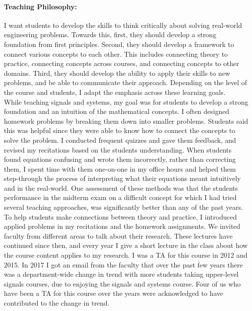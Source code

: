 \documentclass[10pt]{article}
\begin{document}
\paragraph{Teaching Philosophy: }
I want students to develop the skills to think critically about solving real-world engineering problems. 
Towards this, first, they should develop a strong foundation from first principles. Second, they should develop a framework to connect various concepts to each other. This includes connecting theory to practice, connecting concepts across courses, and connecting concepts to other domains. Third, they should develop the ability to apply their skills to new problems, and be able to communicate their approach. Depending on the level of the course and students, I adapt the emphasis across these learning goals.\\


While teaching signals and systems, my goal was for students to develop a strong foundation and an intuition of the mathematical concepts.
I often designed homework problems by breaking them down into smaller problems. Students said this was helpful since they were able to know how to connect the concepts to solve the problem. 
I conducted frequent quizzes and gave them feedback, and revised my recitations based on the students understanding. 
When students found equations confusing and wrote them incorrectly, rather than correcting them, I spent time with them one-on-one in my office hours and helped them step-through the process of interpreting what their equations meant intuitively and in the real-world. %
One assessment of these methods was that the students performance in the midterm exam on a difficult concept for which I had tried several teaching approaches, was significantly better than any of the past years. \\



To help students make connections between theory and practice,  I introduced applied problems in my recitations and the homework assignments. We invited faculty from different areas to talk about their research. These lectures have continued since then, and every year I give a short lecture in the class about how the course content applies to my research.  I was a TA for this course in 2012 and 2015. In 2017 I got an email from the faculty that over the past few years there was a department-wide change in trend with more students taking upper-level signals courses, due to enjoying the signals and systems course. Four of us who have been a TA for this course over the years were acknowledged to have contributed to the change in trend. \\
\end{document}
